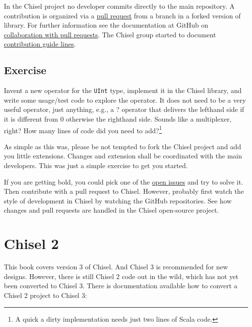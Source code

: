 \documentclass[%
    10pt, %
    headinclude, footexclude,
    openright, %
    notitlepage,
    cleardoubleempty,
    headsepline,
    pointlessnumbers,
    bibtotoc, idxtotoc,
    ]{scrbook}
\newcommand{\code}[1]{{\small{\texttt{#1}}}}
\newcommand{\myref}[2]{\href{#1}{#2}}
\begin{document}
In the Chisel project no developer commits directly to the main repository.
A contribution is organized via a
\myref{https://help.github.com/articles/creating-a-pull-request-from-a-fork/}{pull request}
from a branch in a forked version of library.
For further information see the documentation at GitHub on
\myref{https://help.github.com/categories/collaborating-with-issues-and-pull-requests/}{collaboration with
pull requests}.
The Chisel group started to document
\myref{https://github.com/freechipsproject/chisel-lang-governance/blob/master/reviewer_guidelines.md}{contribution
guide lines}.

\section{Exercise}

Invent a new operator for the \code{UInt} type, implement it in the Chisel library,
and write some usage/test code to explore the operator. It does not need to be
a very useful operator, just anything, e.g., a ? operator that delivers the lefthand side
if it is different from 0 otherwise the righthand side. Sounds like a multiplexer, right?
How many lines of code did you need to add?\footnote{A quick a dirty implementation
needs just two lines of Scala code.}

As simple as this was, please be not tempted to fork the Chisel project and
add you little extensions. Changes and extension shall be coordinated with the
main developers.
This was just a simple exercise to get you started.

If you are getting bold, you could pick one of the
\myref{https://github.com/freechipsproject/chisel3/issues}{open issues} and try to solve it.
Then contribute with a pull request to Chisel.
However, probably first watch the style of development in Chisel by watching the GitHub
repositories.
See how changes and pull requests are handled in the Chisel open-source project.



\chapter{Chisel 2}

This book covers version 3 of Chisel. And Chisel 3 is recommended for new designs.
However, there is still Chisel 2 code out in the wild, which has not yet been converted
to Chisel 3. There is documentation available how to convert a Chisel 2 project to
Chisel 3:
\end{document}
